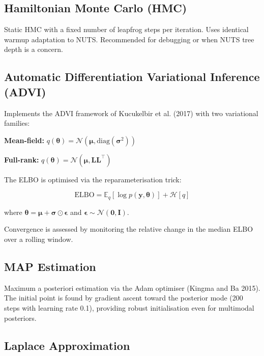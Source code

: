 \documentclass[
  11pt,
]{article}
\begin{document}
\subsection{Hamiltonian Monte Carlo
(HMC)}\label{hamiltonian-monte-carlo-hmc}

Static HMC with a fixed number of leapfrog steps per iteration. Uses
identical warmup adaptation to NUTS. Recommended for debugging or when
NUTS tree depth is a concern.

\subsection{Automatic Differentiation Variational Inference
(ADVI)}\label{automatic-differentiation-variational-inference-advi}

Implements the ADVI framework of Kucukelbir et al. (2017) with two
variational families:

\textbf{Mean-field:}
\(q(\boldsymbol\theta) = \mathcal{N}(\boldsymbol\mu, \text{diag}(\boldsymbol\sigma^2))\)

\textbf{Full-rank:}
\(q(\boldsymbol\theta) = \mathcal{N}(\boldsymbol\mu, \mathbf{L}\mathbf{L}^\top)\)

The ELBO is optimised via the reparameterisation trick:

\[\text{ELBO} = \mathbb{E}_{q}[\log p(\mathbf{y}, \boldsymbol\theta)] + \mathcal{H}[q]\]

where
\(\boldsymbol\theta = \boldsymbol\mu + \boldsymbol\sigma \odot \boldsymbol\epsilon\)
and \(\boldsymbol\epsilon \sim \mathcal{N}(\mathbf{0}, \mathbf{I})\).

Convergence is assessed by monitoring the relative change in the median
ELBO over a rolling window.

\subsection{MAP Estimation}\label{map-estimation}

Maximum a posteriori estimation via the Adam optimiser (Kingma and Ba
2015). The initial point is found by gradient ascent toward the
posterior mode (200 steps with learning rate 0.1), providing robust
initialisation even for multimodal posteriors.

\subsection{Laplace Approximation}\label{laplace-approximation}
\end{document}
